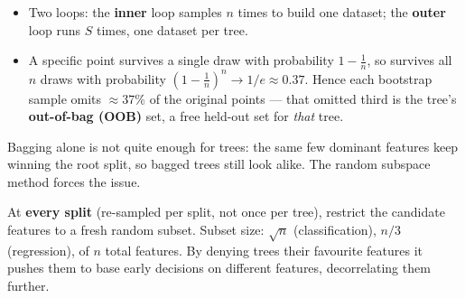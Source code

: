 \documentclass[11pt, a4paper]{article}
\newcommand{\kw}[1]{\textbf{#1}}
\begin{document}
\begin{itemize}
  \item Two loops: the \kw{inner} loop samples $n$ times to build one dataset; the \kw{outer} loop
  runs $S$ times, one dataset per tree.
  \item A specific point survives a single draw with probability $1-\tfrac1n$, so survives all $n$
  draws with probability $(1-\tfrac1n)^n\to 1/e\approx0.37$. Hence each bootstrap sample omits
  $\approx37\%$ of the original points — that omitted third is the tree's \kw{out-of-bag (OOB)} set,
  a free held-out set for \emph{that} tree.
\end{itemize}

Bagging alone is not quite enough for trees: the same few dominant features keep winning the root
split, so bagged trees still look alike. The random subspace method forces the issue.

\begin{defbox}
At \kw{every split} (re-sampled per split, not once per tree), restrict the candidate features to a
fresh random subset. Subset size: $\sqrt n$ (classification), $n/3$ (regression), of $n$ total
features. By denying trees their favourite features it pushes them to base early decisions on
different features, decorrelating them further.
\end{defbox}
\end{document}
